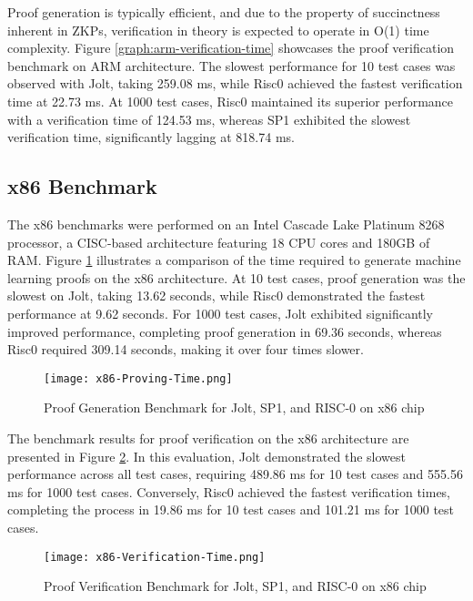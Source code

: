 \documentclass{scrartcl}
\begin{document}
Proof generation is typically efficient, and due to the property of succinctness inherent in ZKPs, verification in theory is expected to operate in  O(1) time complexity. Figure \ref{graph:arm-verification-time} showcases the proof verification benchmark on ARM architecture. The slowest performance for 10 test cases was observed with Jolt, taking 259.08 ms, while Risc0 achieved the fastest verification time at 22.73 ms. At 1000 test cases, Risc0 maintained its superior performance with a verification time of 124.53 ms, whereas SP1 exhibited the slowest verification time, significantly lagging at 818.74 ms.

\subsection{x86 Benchmark}

The x86 benchmarks were performed on an Intel Cascade Lake Platinum 8268 processor, a CISC-based architecture featuring 18 CPU cores and 180GB of RAM. Figure \ref{graph:x86-proving-time} illustrates a comparison of the time required to generate machine learning proofs on the x86 architecture. At 10 test cases, proof generation was the slowest on Jolt, taking 13.62 seconds, while Risc0 demonstrated the fastest performance at 9.62 seconds. For 1000 test cases, Jolt exhibited significantly improved performance, completing proof generation in 69.36 seconds, whereas Risc0 required 309.14 seconds, making it over four times slower.

\begin{figure}
	\begin{center}
		\texttt{[image: x86-Proving-Time.png]}
	\end{center}
	\caption{Proof Generation Benchmark for Jolt, SP1, and RISC-0 on x86 chip}
	\label{graph:x86-proving-time}
\end{figure}

The benchmark results for proof verification on the x86 architecture are presented in Figure \ref{graph:x86-verification-time}. In this evaluation, Jolt demonstrated the slowest performance across all test cases, requiring 489.86 ms for 10 test cases and 555.56 ms for 1000 test cases. Conversely, Risc0 achieved the fastest verification times, completing the process in 19.86 ms for 10 test cases and 101.21 ms for 1000 test cases.

\begin{figure}
	\begin{center}
		\texttt{[image: x86-Verification-Time.png]}
	\end{center}
	\caption{Proof Verification Benchmark for Jolt, SP1, and RISC-0 on x86 chip}
	\label{graph:x86-verification-time}
\end{figure}
\end{document}
